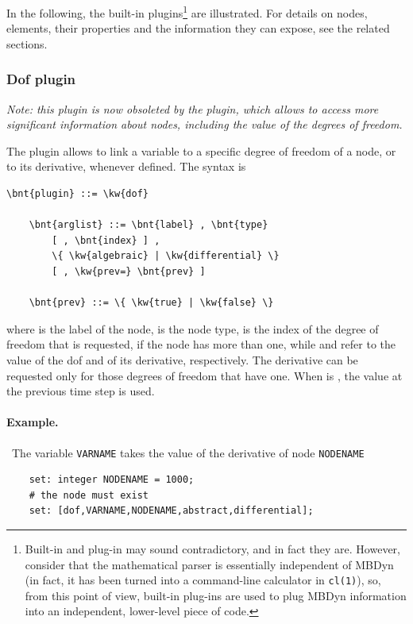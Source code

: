 In the following, the built-in plugins\footnote{Built-in and plug-in
may sound contradictory, and in fact they are.  However, consider
that the mathematical parser is essentially independent of MBDyn
(in fact, it has been turned into a command-line calculator
in \texttt{cl(1)}), so, from this point of view, built-in plug-ins
are used to plug MBDyn information into an independent, lower-level
piece of code.} are illustrated.
For details on nodes, elements, their properties and the information
they can expose, see the related sections.

\subsubsection{Dof plugin}
\emph{Note: this plugin is now obsoleted by the  plugin,
which allows to access more significant information about nodes,
including the value of the degrees of freedom.}

The  plugin allows to link a variable to a specific degree of freedom
of a node, or to its derivative, whenever defined.
The syntax is
\begin{Verbatim}[commandchars=\\\{\}]
    \bnt{plugin} ::= \kw{dof}

    \bnt{arglist} ::= \bnt{label} , \bnt{type}
        [ , \bnt{index} ] ,
        \{ \kw{algebraic} | \kw{differential} \}
        [ , \kw{prev=} \bnt{prev} ]

    \bnt{prev} ::= \{ \kw{true} | \kw{false} \}
\end{Verbatim}
where
 is the label of the node,
 is the node type,
 is the index of the degree of freedom that is requested,
if the node has more than one, while
 and  refer to the value of the dof
and of its derivative, respectively.
The derivative can be requested only for those degrees of freedom
that have one.
When  is , the value at the previous time step is used.

\paragraph{Example.} \
The variable \texttt{VARNAME} takes the value of the derivative
of  node \texttt{NODENAME}
\begin{verbatim}
    set: integer NODENAME = 1000;
    # the node must exist
    set: [dof,VARNAME,NODENAME,abstract,differential];
\end{verbatim}



